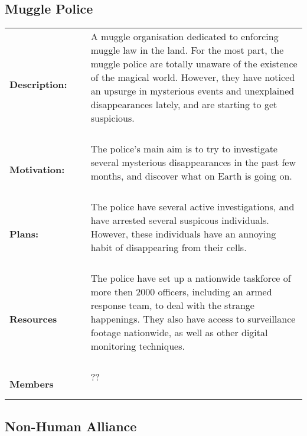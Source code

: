 \documentclass[oneside]{book}
\begin{document}
\subsection{Muggle Police}
\begin{longtable}{p{} p{} p{} }

\bf Description: & ~ &\parbox[t]{\q cm}{A muggle organisation dedicated to enforcing muggle law in the land. For the most part, the muggle police are totally unaware of the existence of the magical world. However, they have noticed an upsurge in mysterious events and unexplained disappearances lately, and are starting to get suspicious. \\~  } 
\\
\bf Motivation:	& ~ & \parbox[t]{\q cm}{ The police's main aim is to try to investigate several mysterious disappearances in the past few months, and discover what on Earth is going on.  \\~  } 
\\
\bf Plans:	& ~ & \parbox[t]{\q cm}{The police have several active investigations, and have arrested several suspicous individuals. However, these individuals have an annoying habit of disappearing from their cells.  \\~  } 
\\
\bf Resources & ~ & \parbox[t]{\q cm}{The police have set up a nationwide taskforce of more then 2000 officers, including an armed response team, to deal with the strange happenings. They also have access to surveillance footage nationwide, as well as other digital monitoring techniques.  \\ ~ }
\\
\bf Members	& ~ &  \parbox[t]{\q cm}{ ?? \\ ~ }

\end{longtable}
\subsection{Non-Human Alliance}
\end{document}

